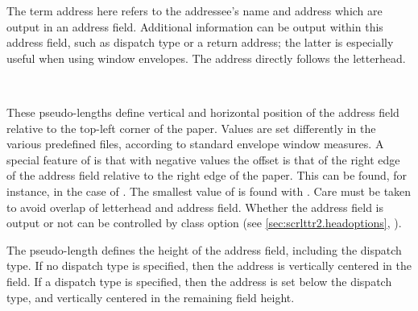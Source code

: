 The term address here refers to the addressee's name and address which
are output in an address field. Additional information can be output
within this address field, such as dispatch type or a return address;
the latter is especially useful when using window envelopes. The
address directly follows the letterhead.

\begin{Declaration}
  \\
\end{Declaration}
%
%
These pseudo-lengths define vertical and horizontal position of the
address field relative to the top-left corner of the paper. Values are
set differently in the various predefined  files, according
to standard envelope window measures. A special feature of
 is that with negative values the offset is that
of the right edge of the address field relative to the right edge of
the paper. This can be found, for instance, in the case of
. The smallest value of  is found with
. Care must be taken to avoid overlap of letterhead
and address field. Whether the address field is output or not can be
controlled by class option  (see
\autoref{sec:scrlttr2.headoptions},
).
%
%
%

\begin{Declaration}
\end{Declaration}
%
The pseudo-length  defines the height of the
address field, including the dispatch type. If no dispatch type is
specified, then the address is vertically centered in the field. If a
dispatch type is specified, then the address is set below the dispatch
type, and vertically centered in the remaining field height.
%
%
 

